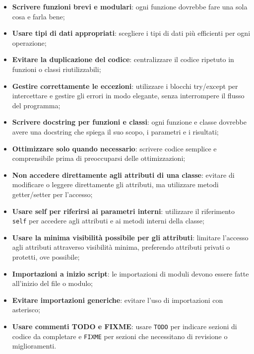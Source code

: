 \begin{itemize}
    \item \textbf{Scrivere funzioni brevi e modulari}: ogni funzione dovrebbe fare una sola cosa e farla bene;
    \item \textbf{Usare tipi di dati appropriati}: scegliere i tipi di dati più efficienti per ogni operazione;
    \item \textbf{Evitare la duplicazione del codice}: centralizzare il codice ripetuto in funzioni o classi riutilizzabili;
    \item \textbf{Gestire correttamente le eccezioni}: utilizzare i blocchi try/except per intercettare e gestire gli errori in modo elegante, senza interrompere il flusso del programma;
    \item \textbf{Scrivere docstring per funzioni e classi}: ogni funzione e classe dovrebbe avere una docstring che spiega il suo scopo, i parametri e i risultati;
    \item \textbf{Ottimizzare solo quando necessario}: scrivere codice semplice e comprensibile prima di preoccuparsi delle ottimizzazioni;
    \item \textbf{Non accedere direttamente agli attributi di una classe}: evitare di modificare o leggere direttamente gli attributi, ma utilizzare metodi getter/setter per l'accesso;
    \item \textbf{Usare self per riferirsi ai parametri interni}: utilizzare il riferimento \texttt{self} per accedere agli attributi e ai metodi interni della classe;
    \item \textbf{Usare la minima visibilità possibile per gli attributi}: limitare l'accesso agli attributi attraverso visibilità minima, preferendo attributi privati o protetti, ove possibile;
    \item \textbf{Importazioni a inizio script}: le importazioni di moduli devono essere fatte all'inizio del file o modulo;
    \item \textbf{Evitare importazioni generiche}: evitare l'uso di importazioni con asterisco;
    \item \textbf{Usare commenti TODO e FIXME}: usare \texttt{TODO} per indicare sezioni di codice da completare e \texttt{FIXME} per sezioni che necessitano di revisione o miglioramenti.
\end{itemize}

